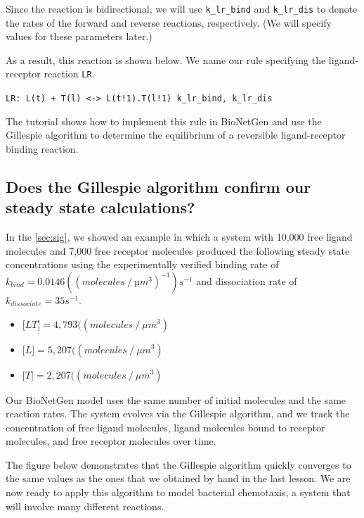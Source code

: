 Since the reaction is bidirectional, we will use \texttt{k\_lr\_bind} and \texttt{k\_lr\_dis} to denote the rates of the forward and reverse reactions, respectively. (We will specify values for these parameters later.)

As a result, this reaction is shown below. We name our rule specifying the ligand-receptor reaction \texttt{LR}.


\texttt{LR: L(t) + T(l) <-> L(t!1).T(l!1) k\_lr\_bind, k\_lr\_dis}


The tutorial  shows how to implement this rule in BioNetGen and use the Gillespie algorithm to determine the equilibrium of a reversible ligand-receptor binding reaction.


\FloatBarrier
{}
\subsection{Does the Gillespie algorithm confirm our steady state calculations?}

In the \autoref{sec:sig}, we showed an example in which a system with 10,000 free ligand molecules and 7,000 free receptor molecules produced the following steady state concentrations using the experimentally verified binding rate of $k_{bind} = 0.0146 ((molecules\mathbin{/}µm^3)^{-1})s^{-1}$ and dissociation rate of $k_{dissociate} = 35s^{-1}$.

\begin{itemize}
\item $\text{[}LT\text{]} = 4,793 ((molecules\mathbin{/}\mu m^3)$
\item $\text{[}L\text{]} = 5,207 ((molecules\mathbin{/}\mu m^3)$
\item $\text{[}T\text{]} = 2,207 ((molecules\mathbin{/}\mu m^3)$
\end{itemize}

Our BioNetGen model uses the same number of initial molecules and the same reaction rates. The system evolves via the Gillespie algorithm, and we track the concentration of free ligand molecules, ligand molecules bound to receptor molecules, and free receptor molecules over time.

The figure below demonstrates that the Gillespie algorithm quickly converges to the same values as the ones that we obtained by hand in the last lesson. We are now ready to apply this algorithm to model bacterial chemotaxis, a system that will involve many different reactions.

